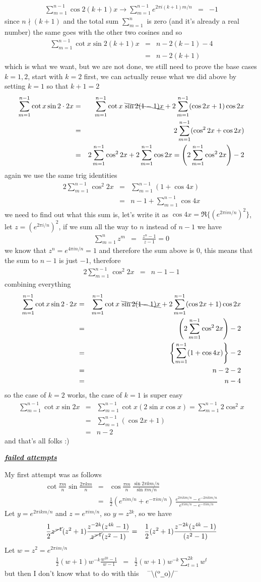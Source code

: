 \documentclass[aps,preprint,preprintnumbers,nofootinbib,showpacs,prd]{revtex4-1}
\newcommand{\nbea}{\begin{eqnarray*}}
\newcommand{\neea}{\end{eqnarray*}}
\newcommand{\dunno}{$ {}^{\mbox {--}}\backslash(^{\rm o}{}\underline{\hspace{0.2cm}}{\rm o})/^{\mbox {--}}$}
\begin{document}
%
\nbea
\sum_{m=1}^{n-1} \cos2(k+1)x \to \sum_{m=1}^{n-1} e^{2\pi i (k+1)m/n} & = & -1
\neea
%
since $n\nmid (k+1)$ and the total sum $\sum_{m=1}^n$ is zero (and it's already a real number) the same goes with the other two cosines and so
%
\nbea
\sum_{m=1}^{n-1} \cot x \sin 2(k+1)x & = & n - 2(k-1) - 4 \\
& = & n - 2(k+1) 
\neea
%
which is what we want, but we are not done, we still need to prove the base cases $k = 1,2$, start with $k=2$ first, we can actually reuse what we did above by setting $k = 1$ so that $k+1 = 2$
%
\nbea
\sum_{m=1}^{n-1} \cot x \sin 2\cdot2x & = & \sum_{m=1}^{n-1} \cot x ~\bcancel{\sin 2(1-1)x} + 2\sum_{m=1}^{n-1} (\cos2 x + 1) \cos 2x \\
& = & 2\sum_{m=1}^{n-1} (\cos^2 2 x + \cos 2x) \\
& = & 2\sum_{m=1}^{n-1} \cos^2 2 x + 2\sum_{m=1}^{n-1} \cos 2x = \left(2\sum_{m=1}^{n-1} \cos^2 2 x\right)  - 2
\neea
%
again we use the same trig identities
%
\nbea
2\sum_{m=1}^{n-1} \cos^2 2 x & = & \sum_{m=1}^{n-1} (1 + \cos4x) \\
& = & n - 1 + \sum_{m=1}^{n-1} \cos4x
\neea
%
we need to find out what this sum is, let's write it as $\cos 4x = \Re\{(e^{2\pi i m/n})^2\}$, let $z = (e^{2\pi i /n})^2$, if we sum all the way to $n$ instead of $n-1$ we have
%
\nbea
\sum_{m=1}^{n} z^m & = & \frac{z^n - 1}{z-1} = 0
\neea
%
we know that $z^n = e^{4\pi i n/n} = 1$ and therefore the sum above is 0, this means that the sum to $n-1$ is just $-1$, therefore
%
\nbea
2\sum_{m=1}^{n-1} \cos^2 2 x & = & n - 1 -1
\neea
%
combining everything
%
\nbea
\sum_{m=1}^{n-1} \cot x \sin 2\cdot2x & = & \sum_{m=1}^{n-1} \cot x ~\bcancel{\sin 2(1-1)x} + 2\sum_{m=1}^{n-1} (\cos2 x + 1) \cos 2x \\
& = & \left(2\sum_{m=1}^{n-1} \cos^2 2 x\right)  - 2 \\
& = & \left\{\sum_{m=1}^{n-1} (1 + \cos4x) \right\} -2 \\
& = & n-2-2 \\
& = & n-4
\neea
%
so the case of $k=2$ works, the case of $k=1$ is super easy
%
\nbea
\sum_{m=1}^{n-1} \cot x \sin 2x & = & \sum_{m=1}^{n-1} \cot x (2 \sin x \cos x) = \sum_{m=1}^{n-1} 2\cos^2 x   \\
& = & \sum_{m=1}^{n-1} (\cos 2x + 1) \\
& = & n - 2
\neea
%
and that's all folks :)

\smallskip
\underline{\textit{\textbf{failed attempts}}}

My first attempt was as follows
%
\nbea
\cot\frac{\pi m}{n} \sin \frac{2\pi k m}{n} & = & \cos\frac{\pi m}{n} ~ \frac{\sin 2\pi k m/n}{\sin\pi m/n} \\
& = & \frac{1}{2}(e^{\pi i m/n} + e^{-\pi i m/n}) ~ \frac{e^{2\pi i km/n} - e^{-2\pi i km/n}}{e^{\pi i m/n} - e^{-\pi i m/n}}
\neea
%
Let $y = e^{2\pi i km/n}$ and $z = e^{\pi i m/n}$, so $y = z^{2k}$, so we have
%
\nbea
\frac{1}{2}\cancel{z^{-1}}(z^2 + 1) \frac{z^{-2k}(z^{4k} - 1)}{\cancel{z^{-1}}(z^2 - 1)} & = & \frac{1}{2}(z^2 + 1) \frac{z^{-2k}(z^{4k} - 1)}{(z^2 - 1)}
\neea
%
Let $w = z^2 = e^{2\pi i m/n}$
%
\nbea
\frac{1}{2}(w + 1) w^{-k} \frac{w^{2k} - 1}{w-1} & = & \frac{1}{2}(w+1) w^{-k} \sum_{t=1}^{2k} w^t
\neea
%
but then I don't know what to do with this ~ \dunno
\end{document}

